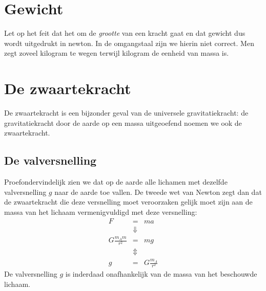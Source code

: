\section{Gewicht}




Let op het feit dat het om de \textit{grootte} van een kracht gaat en dat gewicht dus wordt uitgedrukt in newton. In de omgangstaal zijn we hierin niet correct. Men zegt zoveel kilogram te wegen terwijl kilogram de eenheid van massa is.



\section{De zwaartekracht}
De zwaartekracht is een bijzonder geval van de universele gravitatiekracht: de gravitatiekracht door de aarde op een massa uitgeoefend noemen we ook de zwaartekracht.

\subsection{De valversnelling}

Proefondervindelijk zien we dat op de aarde alle lichamen met
dezelfde valversnelling $g$ naar de aarde toe vallen. De tweede wet
van Newton zegt dan dat de zwaartekracht die deze versnelling moet
veroorzaken gelijk moet zijn aan de massa van het lichaam
vermenigvuldigd met deze versnelling:
\begin{eqnarray}
F&=&ma\nonumber\\
&\Downarrow&\nonumber\\
G\frac{m_Am}{r^2}&=&mg\nonumber\\
&\Updownarrow&\nonumber\\
g&=&G\frac{m_A}{r^2}
\end{eqnarray}
De valversnelling $g$ is inderdaad onafhankelijk van de massa van
het be\-schouw\-de lichaam.

